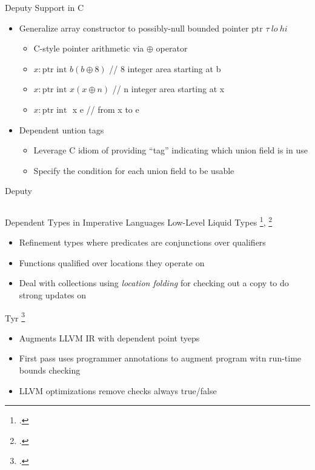 \documentclass[aspectratio=169]{beamer}
\begin{document}
\begin{frame}{Deputy}
Support in C
    \begin{itemize}
        \item Generalize array constructor to possibly-null bounded pointer $\text{ptr }\tau \ lo\ hi$
            \begin{itemize}
                \item C-style pointer arithmetic via $\oplus$ operator
                \item $x:\text{ptr int } b (b \oplus 8)$ // 8 integer area starting at b
                \item $x:\text{ptr int } x (x \oplus n)$ // n integer area starting at x
                \item $x:\text{ptr int }$ x e // from x to e
            \end{itemize}
        \item Dependent untion tags
            \begin{itemize}
                \item Leverage C idiom of providing ``tag'' indicating which union field is in use
                \item Specify the condition for each union field to be usable
            \end{itemize}
    \end{itemize}
\end{frame}

\begin{frame}{Deputy}
\begin{columns}[T]
\begin{column}{0.45\textwidth}
      
\end{column}
\begin{column}{0.45\textwidth}
      
\end{column}
\end{columns}
\end{frame}

\begin{frame}{Dependent Types in Imperative Languages}
Low-Level Liquid Types \footcite{rondon_liquid_2008}, \footcite{rondon_low-level_2010}
\begin{itemize}
    \item Refinement types where predicates are conjunctions over qualifiers
    \item Functions qualified over locations they operate on
    \item Deal with collections using \emph{location folding} for checking out a copy to do strong updates on
\end{itemize}
Tyr \footcite{de_araujo_tyr:_2016}
\begin{itemize}
    \item Augments LLVM IR with dependent point tyeps
    \item First pass uses programmer annotations to augment program witn run-time bounds checking
    \item LLVM optimizations remove checks always true/false
\end{itemize}
\end{frame}
\end{document}
